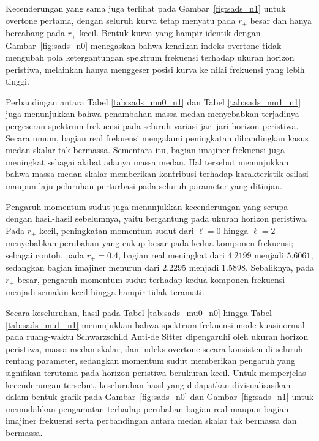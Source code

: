 Kecenderungan yang sama juga terlihat pada Gambar~\ref{fig:sads_n1} untuk overtone pertama, dengan seluruh kurva tetap menyatu pada $r_+$ besar dan hanya bercabang pada $r_+$ kecil. Bentuk kurva yang hampir identik dengan Gambar~\ref{fig:sads_n0} menegaskan bahwa kenaikan indeks overtone tidak mengubah pola ketergantungan spektrum frekuensi terhadap ukuran horizon peristiwa, melainkan hanya menggeser posisi kurva ke nilai frekuensi yang lebih tinggi.

Perbandingan antara Tabel \ref{tab:sads_mu0_n1} dan Tabel \ref{tab:sads_mu1_n1} juga menunjukkan bahwa penambahan massa medan menyebabkan terjadinya pergeseran spektrum frekuensi pada seluruh variasi jari-jari horizon peristiwa. Secara umum, bagian real frekuensi mengalami peningkatan dibandingkan kasus medan skalar tak bermassa. Sementara itu, bagian imajiner frekuensi juga meningkat sebagai akibat adanya massa medan. Hal tersebut menunjukkan bahwa massa medan skalar memberikan kontribusi terhadap karakteristik osilasi maupun laju peluruhan perturbasi pada seluruh parameter yang ditinjau.

Pengaruh momentum sudut juga menunjukkan kecenderungan yang serupa dengan hasil-hasil sebelumnya, yaitu bergantung pada ukuran horizon peristiwa. Pada $r_+$ kecil, peningkatan momentum sudut dari $\ell=0$ hingga $\ell=2$ menyebabkan perubahan yang cukup besar pada kedua komponen frekuensi; sebagai contoh, pada $r_+=0.4$, bagian real meningkat dari $4.2199$ menjadi $5.6061$, sedangkan bagian imajiner menurun dari $2.2295$ menjadi $1.5898$. Sebaliknya, pada $r_+$ besar, pengaruh momentum sudut terhadap kedua komponen frekuensi menjadi semakin kecil hingga hampir tidak teramati.

Secara keseluruhan, hasil pada Tabel \ref{tab:sads_mu0_n0} hingga Tabel \ref{tab:sads_mu1_n1} menunjukkan bahwa spektrum frekuensi mode kuasinormal pada ruang-waktu Schwarzschild Anti-de Sitter dipengaruhi oleh ukuran horizon peristiwa, massa medan skalar, dan indeks overtone secara konsisten di seluruh rentang parameter, sedangkan momentum sudut memberikan pengaruh yang signifikan terutama pada horizon peristiwa berukuran kecil. Untuk memperjelas kecenderungan tersebut, keseluruhan hasil yang didapatkan divisualisasikan dalam bentuk grafik pada Gambar~\ref{fig:sads_n0} dan Gambar~\ref{fig:sads_n1} untuk memudahkan pengamatan terhadap perubahan bagian real maupun bagian imajiner frekuensi serta perbandingan antara medan skalar tak bermassa dan bermassa.